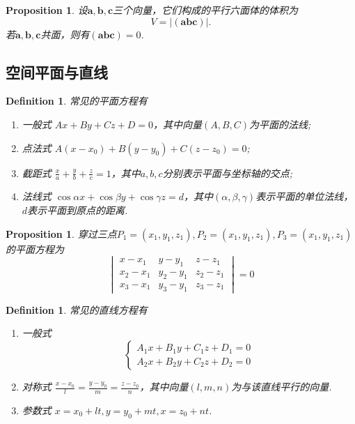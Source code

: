 \documentclass{article}
\newcommand{\mbf}[1]{\bm{#1}}
\newtheorem{proposition}[theorem]{Proposition}
\newtheorem{definition}[theorem]{Definition}
\begin{document}
\begin{proposition}
\rm 设$\mbf{a},\mbf{b},\mbf{c}$三个向量，它们构成的平行六面体的体积为
$$
V = |(\mbf{a}\mbf{b}\mbf{c})|.
$$
若$\mbf{a},\mbf{b},\mbf{c}$共面，则有$(\mbf{a}\mbf{b}\mbf{c})=0$.  
\end{proposition}

\subsection{空间平面与直线}

\begin{definition}
\rm 常见的平面方程有
\begin{enumerate}
	\item 一般式 $Ax+By+Cz+D = 0$，其中向量$(A,B,C)$为平面的法线;
	\item 点法式 $A(x-x_0) + B(y-y_0) + C(z-z_0) = 0$;
	\item 截距式 $\frac{x}{a} + \frac{y}{b} + \frac{z}{c} = 1$，其中$a,b,c$分别表示平面与坐标轴的交点;
	\item 法线式 $\cos\alpha x + \cos\beta y + \cos\gamma z = d$，其中$(\alpha,\beta,\gamma)$表示平面的单位法线，$d$表示平面到原点的距离. 
\end{enumerate}
\end{definition}

\begin{proposition}
\rm 穿过三点$P_1 = (x_1,y_1,z_1),P_2 = (x_1,y_1,z_1),P_3 = (x_1,y_1,z_1)$的平面方程为
$$
{\begin{vmatrix}
x-x_{1} & y-y_{1} & z-z_{1}\\
x_{2}-x_{1} & y_{2}-y_{1} & z_{2}-z_{1}\\
x_{3}-x_{1} & y_{3}-y_{1} & z_{3}-z_{1}
\end{vmatrix}}=0
$$
\end{proposition}

\begin{definition}
\rm 常见的直线方程有
\begin{enumerate}
	\item 一般式
		$$
			\left\{
			\begin{array}{ll}
			A_1x+B_1y+C_1z+D_1 = 0 \\
			A_2x+B_2y+C_2z+D_2 = 0
			\end{array} \right.
		$$
	\item 对称式 $\frac{x-x_0}{l} = \frac{y-y_0}{m} = \frac{z-z_0}{n}$，其中向量$(l,m,n)$为与该直线平行的向量.
	\item 参数式 $x = x_0 + lt,y = y_0 + mt,x = z_0 + nt$. 	
\end{enumerate}
\end{definition}
\end{document}
